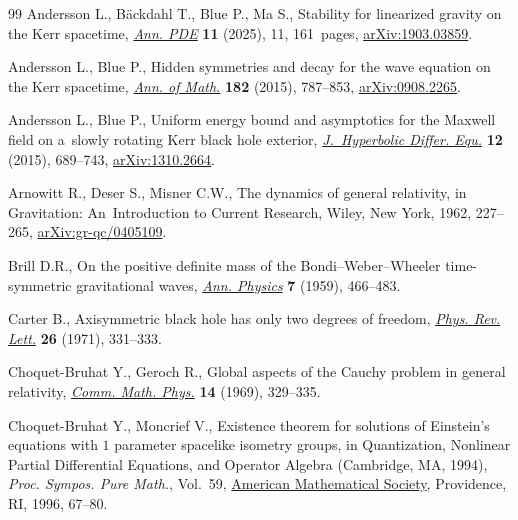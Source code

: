 \documentclass[11pt]{article}
\numberwithin{equation}{section}
\numberwithin{equation}{section}
\begin{document}
\begin{thebibliography}{99}
Andersson L., B\"ackdahl T., Blue P., Ma S., Stability for linearized gravity
 on the {K}err spacetime,
 \href{https://doi.org/10.1007/s40818-024-00193-w}{\textit{Ann. PDE}}
 \textbf{11} (2025), 11, 161~pages,
 \href{http://arxiv.org/abs/1903.03859}{arXiv:1903.03859}.

Andersson L., Blue P., Hidden symmetries and decay for the wave equation on the
 {K}err spacetime,
 \href{https://doi.org/10.4007/annals.2015.182.3.1}{\textit{Ann. of Math.}}
 \textbf{182} (2015), 787--853,
 \href{http://arxiv.org/abs/0908.2265}{arXiv:0908.2265}.

Andersson L., Blue P., Uniform energy bound and asymptotics for the {M}axwell
 field on a~slowly rotating {K}err black hole exterior,
 \href{https://doi.org/10.1142/S0219891615500204}{\textit{J.~Hyperbolic
 Differ. Equ.}} \textbf{12} (2015), 689--743,
 \href{http://arxiv.org/abs/1310.2664}{arXiv:1310.2664}.

Arnowitt R., Deser S., Misner C.W., The dynamics of general relativity, in
 Gravitation: {A}n~Introduction to Current Research, Wiley, New York, 1962,
 227--265, \href{http://arxiv.org/abs/gr-qc/0405109}{arXiv:gr-qc/0405109}.

Brill D.R., On the positive definite mass of the {B}ondi--{W}eber--{W}heeler
 time-symmetric gravitational waves,
 \href{https://doi.org/10.1016/0003-4916(59)90055-7}{\textit{Ann. Physics}}
 \textbf{7} (1959), 466--483.

Carter B., Axisymmetric black hole has only two degrees of freedom,
 \href{https://doi.org/10.1103/PhysRevLett.26.331}{\textit{Phys. Rev. Lett.}}
 \textbf{26} (1971), 331--333.

Choquet-Bruhat Y., Geroch R., Global aspects of the {C}auchy problem in general
 relativity, \href{https://doi.org/10.1007/BF01645389}{\textit{Comm. Math.
 Phys.}} \textbf{14} (1969), 329--335.

Choquet-Bruhat Y., Moncrief V., Existence theorem for solutions of {E}instein's
 equations with {$1$} parameter spacelike isometry groups, in Quantization,
 Nonlinear Partial Differential Equations, and Operator Algebra ({C}ambridge,
 {MA}, 1994), \textit{Proc. Sympos. Pure Math.}, Vol.~59,
 \href{https://doi.org/10.1090/pspum/059/1392984}{American Mathematical
 Society}, Providence, RI, 1996, 67--80.


\end{thebibliography}
\end{document}
